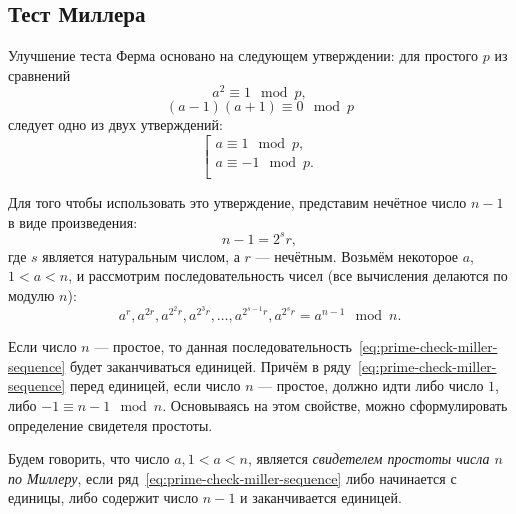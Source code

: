 \subsection{Тест Миллера}\label{section-prime-check-miller}

Улучшение теста Ферма основано на следующем утверждении: для простого $p$ из сравнений
    \[ a^2 \equiv 1 \mod p, \]
    \[ (a-1)(a+1) \equiv 0 \mod p \]
следует одно из двух утверждений: 
\[ \left[ \begin{array}{l}
     a \equiv 1 \mod p, \\
     a \equiv -1 \mod p. \\
\end{array} \right. \]

Для того чтобы использовать это утверждение, представим нечётное число $n - 1$ в виде произведения:
    \[ n-1 = 2^s r, \]
где $s$ является натуральным числом, а $r$ --- нечётным. Возьмём некоторое $a$, $1 < a < n$, и рассмотрим последовательность чисел (все вычисления делаются по модулю $n$):
\begin{equation}\label{eq:prime-check-miller-sequence}
	a^{r}, a^{2r}, a^{2^2 r}, a^{2^3 r}, \dots, a^{2^{s-1} r}, a^{2^s r} = a^{n-1} \mod n.
\end{equation}

Если число $n$ --- простое, то данная последовательность~\ref{eq:prime-check-miller-sequence} будет заканчиваться единицей. Причём в ряду~\ref{eq:prime-check-miller-sequence} перед единицей, если число $n$ --- простое, должно идти либо число $1$, либо $-1 \equiv n-1 \mod n$. Основываясь на этом свойстве, можно сформулировать определение свидетеля простоты.

Будем говорить, что число $a, 1 < a < n$, является \emph{свидетелем простоты числа $n$ по Миллеру}, если ряд~\ref{eq:prime-check-miller-sequence} либо начинается с единицы, либо содержит число $n-1$ и заканчивается единицей.

